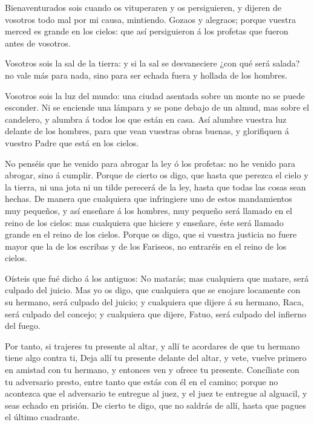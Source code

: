  Bienaventurados sois cuando os vituperaren y os
persiguieren, y dijeren de vosotros todo mal por mi causa, mintiendo.
 Gozaos y alegraos; porque vuestra merced es grande en los
cielos: que así persiguieron á los profetas que fueron antes de
vosotros.

 Vosotros sois la sal de la tierra: y si la sal se
desvaneciere ¿con qué será salada? no vale más para nada, sino para ser
echada fuera y hollada de los hombres.

 Vosotros sois la luz del mundo: una ciudad asentada sobre
un monte no se puede esconder.  Ni se enciende una lámpara
y se pone debajo de un almud, mas sobre el candelero, y alumbra á todos
los que están en casa.  Así alumbre vuestra luz delante de
los hombres, para que vean vuestras obras buenas, y glorifiquen á
vuestro Padre que está en los cielos.

 No penséis que he venido para abrogar la ley ó los
profetas: no he venido para abrogar, sino á cumplir. 
Porque de cierto os digo, que hasta que perezca el cielo y la tierra, ni
una jota ni un tilde perecerá de la ley, hasta que todas las cosas sean
hechas.  De manera que cualquiera que infringiere uno de
estos mandamientos muy pequeños, y así enseñare á los hombres, muy
pequeño será llamado en el reino de los cielos: mas cualquiera que
hiciere y enseñare, éste será llamado grande en el reino de los cielos.
 Porque os digo, que si vuestra justicia no fuere mayor que
la de los escribas y de los Fariseos, no entraréis en el reino de los
cielos.

 Oísteis que fué dicho á los antiguos: No matarás; mas
cualquiera que matare, será culpado del juicio.  Mas yo os
digo, que cualquiera que se enojare locamente con su hermano, será
culpado del juicio; y cualquiera que dijere á su hermano, Raca, será
culpado del concejo; y cualquiera que dijere, Fatuo, será culpado del
infierno del fuego.

 Por tanto, si trajeres tu presente al altar, y allí te
acordares de que tu hermano tiene algo contra ti,  Deja
allí tu presente delante del altar, y vete, vuelve primero en amistad
con tu hermano, y entonces ven y ofrece tu presente. 
Concíliate con tu adversario presto, entre tanto que estás con él en el
camino; porque no acontezca que el adversario te entregue al juez, y el
juez te entregue al alguacil, y seas echado en prisión.  De
cierto te digo, que no saldrás de allí, hasta que pagues el último
cuadrante.

